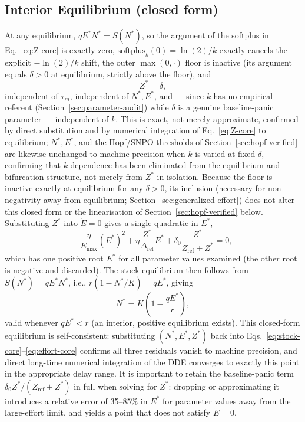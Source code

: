 \documentclass[twocolumn,10pt]{article}
\begin{document}
\subsection{Interior Equilibrium (closed form)}
\label{sec:equilibrium-core}
At any equilibrium, $qE^*N^*=S(N^*)$, so the argument of the softplus in Eq.~\eqref{eq:Z-core} is exactly zero, $\text{softplus}_k(0)=\ln(2)/k$ exactly cancels the explicit $-\ln(2)/k$ shift, the outer $\max(0,\cdot)$ floor is inactive (its argument equals $\delta>0$ at equilibrium, strictly above the floor), and
\begin{equation}
Z^* = \delta,
\label{eq:Zstar-corrected}
\end{equation}
independent of $\tau_m$, independent of $N^*,E^*$, and — since $k$ has no empirical referent (Section~\ref{sec:parameter-audit}) while $\delta$ is a genuine baseline-panic parameter — independent of $k$. This is exact, not merely approximate, confirmed by direct substitution and by numerical integration of Eq.~\eqref{eq:Z-core} to equilibrium; $N^*,E^*$, and the Hopf/SNPO thresholds of Section~\ref{sec:hopf-verified} are likewise unchanged to machine precision when $k$ is varied at fixed $\delta$, confirming that $k$-dependence has been eliminated from the equilibrium and bifurcation structure, not merely from $Z^*$ in isolation. Because the floor is inactive exactly at equilibrium for any $\delta>0$, its inclusion (necessary for non-negativity away from equilibrium; Section~\ref{sec:generalized-effort}) does not alter this closed form or the linearisation of Section~\ref{sec:hopf-verified} below. Substituting $Z^*$ into $\dot E=0$ gives a single quadratic in $E^*$,
\begin{equation}
-\frac{\eta}{E_{\max}}(E^*)^2 + \eta\frac{Z^*}{\Delta_{\text{ref}}}E^* + \delta_0\frac{Z^*}{Z_{\text{ref}}+Z^*} = 0,
\label{eq:Estar-quadratic}
\end{equation}
which has one positive root $E^*$ for all parameter values examined (the other root is negative and discarded). The stock equilibrium then follows from $S(N^*)=qE^*N^*$, i.e., $r(1-N^*/K)=qE^*$, giving
\begin{equation}
N^* = K\left(1-\frac{qE^*}{r}\right),
\label{eq:Nstar-corrected}
\end{equation}
valid whenever $qE^*<r$ (an interior, positive equilibrium exists). This closed-form equilibrium is self-consistent: substituting $(N^*,E^*,Z^*)$ back into Eqs.~\eqref{eq:stock-core}--\eqref{eq:effort-core} confirms all three residuals vanish to machine precision, and direct long-time numerical integration of the DDE converges to exactly this point in the appropriate delay range. It is important to retain the baseline-panic term $\delta_0 Z^*/(Z_{\text{ref}}+Z^*)$ in full when solving for $Z^*$: dropping or approximating it introduces a relative error of 35--85\% in $E^*$ for parameter values away from the large-effort limit, and yields a point that does not satisfy $\dot E=0$.
\end{document}

